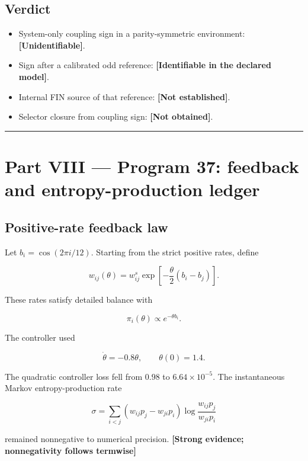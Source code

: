 \documentclass[11pt,a4paper,openany]{report}
\begin{document}
\section{Verdict}

\begin{itemize}
\item 
System-only coupling sign in a parity-symmetric environment: \textbf{[Unidentifiable]}.

\item 
Sign after a calibrated odd reference: \textbf{[Identifiable in the declared model]}.

\item 
Internal FIN source of that reference: \textbf{[Not established]}.

\item 
Selector closure from coupling sign: \textbf{[Not obtained]}.

\end{itemize}

\par\medskip\hrule\medskip

\chapter{Part VIII — Program 37: feedback and entropy-production ledger}

\section{Positive-rate feedback law}

Let \(b_i=\cos(2\pi i/12)\). Starting from the strict positive rates, define

\[
w_{ij}(\theta)
=w^s_{ij}
\exp\!\left[-\frac\theta2(b_i-b_j)\right].
\]

These rates satisfy detailed balance with

\[
\pi_i(\theta)\propto e^{-\theta b_i}.
\]

The controller used

\[
\dot\theta=-0.8\theta,
\qquad \theta(0)=1.4.
\]

The quadratic controller loss fell from \(0.98\) to \(6.64\times10^{-5}\). The instantaneous Markov entropy-production rate

\[
\sigma
=\sum_{i<j}
(w_{ij}p_j-w_{ji}p_i)
\log\frac{w_{ij}p_j}{w_{ji}p_i}
\]

remained nonnegative to numerical precision. \textbf{[Strong evidence; nonnegativity follows termwise]}
\end{document}

